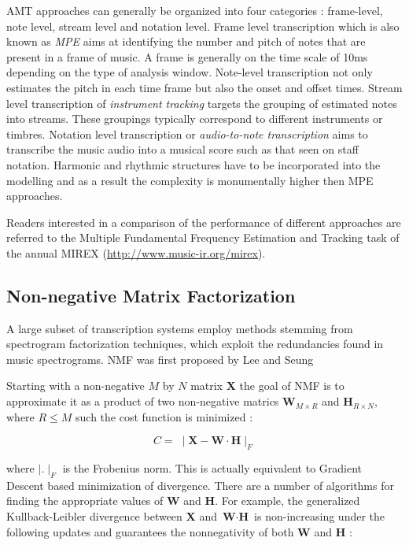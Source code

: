 \ac{AMT} approaches can generally be organized into four categories : frame-level,
note level, stream level and notation level. Frame level transcription which is
also known as \emph{\ac{MPE}} aims at identifying the number and
pitch of notes that are present in a frame of music. A frame is generally on the
time scale of 10ms depending on the type of analysis window. Note-level
transcription not only estimates the pitch in each time frame but also the onset
and offset times. Stream level transcription of \emph{instrument tracking}
targets the grouping of estimated notes into streams. These groupings typically
correspond to different instruments or timbres. Notation level transcription or
\emph{audio-to-note transcription} aims to transcribe the music audio into a
musical score such as that seen on staff notation. Harmonic and rhythmic
structures have to be incorporated into the modelling and as a result the
complexity is monumentally higher then \ac{MPE} approaches.
\cite{MIR-recent-dev:Schedl}

Readers interested in a comparison of the performance of different approaches
are referred to the Multiple Fundamental Frequency Estimation and Tracking task
of the annual \ac{MIREX}
(\url{http://www.music-ir.org/mirex}).


\subsection{Non-negative Matrix Factorization}

A large subset of transcription systems employ methods stemming from spectrogram
factorization techniques, which exploit the redundancies found in music
spectrograms. \ac{NMF} was first proposed by Lee
and Seung \cite{nmf1999:Seung}


Starting with a non-negative $M$ by $N$ matrix \textbf{X} the goal of \ac{NMF} is to
approximate it as a product of two non-negative matrics $ \textbf{W}_{M \times
    R}$ and $\textbf{H}_{R \times N}$, where $R \leq M$ such the cost function is
minimized :

\begin{equation}
  C = \;\mid \textbf{X} - \textbf{W}\cdot \textbf{H} \mid _ {F}
\end{equation}

where $\mid . \mid_{F}$ is the Frobenius norm. This is actually equivalent to
Gradient Descent based minimization of divergence. \cite{nmfamt2003:Smaragdis}
There are a number of algorithms for finding the appropriate values of
\textbf{W} and \textbf{H}. For example, the generalized Kullback-Leibler
divergence between \textbf{X} and $\textbf{W}\cdot \textbf{H}$ is non-increasing
under the following updates and guarantees the nonnegativity of both \textbf{W}
and \textbf{H} :

